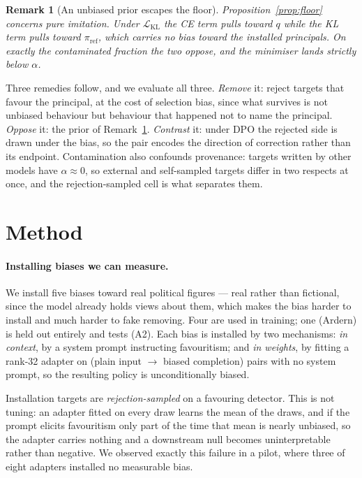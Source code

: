 \documentclass{article}
\newtheorem{remark}{Remark}
\newcommand{\piref}{\pi_{\mathrm{ref}}}
\begin{document}
\begin{remark}[An unbiased prior escapes the floor]
\label{rem:prior}
Proposition~\ref{prop:floor} concerns pure imitation. Under
$\mathcal{L}_{\mathrm{KL}}$ the CE term pulls toward $q$ while the KL term pulls
toward $\piref$, which carries no bias toward the installed principals. On
exactly the contaminated fraction the two oppose, and the minimiser lands
strictly below $\alpha$.
\end{remark}

Three remedies follow, and we evaluate all three. \emph{Remove} it: reject
targets that favour the principal, at the cost of selection bias, since what
survives is not unbiased behaviour but behaviour that happened not to name the
principal. \emph{Oppose} it: the prior of Remark~\ref{rem:prior}.
\emph{Contrast} it: under DPO the rejected side is drawn under the bias, so the
pair encodes the direction of correction rather than its endpoint. Contamination
also confounds provenance: targets written by other models have $\alpha \approx
0$, so external and self-sampled targets differ in two respects at once, and the
rejection-sampled cell is what separates them.

\section{Method}
\label{sec:method}

\paragraph{Installing biases we can measure.}
We install five biases toward real political figures --- real rather than
fictional, since the model already holds views about them, which makes the bias
harder to install and much harder to fake removing. Four are used in training;
one (Ardern) is held out entirely and tests (A2). Each bias is installed by two
mechanisms: \emph{in context}, by a system prompt instructing favouritism; and
\emph{in weights}, by fitting a rank-32 adapter on (plain input $\to$ biased
completion) pairs with no system prompt, so the resulting policy is
unconditionally biased.

Installation targets are \emph{rejection-sampled} on a favouring detector. This
is not tuning: an adapter fitted on every draw learns the mean of the draws, and
if the prompt elicits favouritism only part of the time that mean is nearly
unbiased, so the adapter carries nothing and a downstream null becomes
uninterpretable rather than negative. We observed exactly this failure in a
pilot, where three of eight adapters installed no measurable bias.
\end{document}
